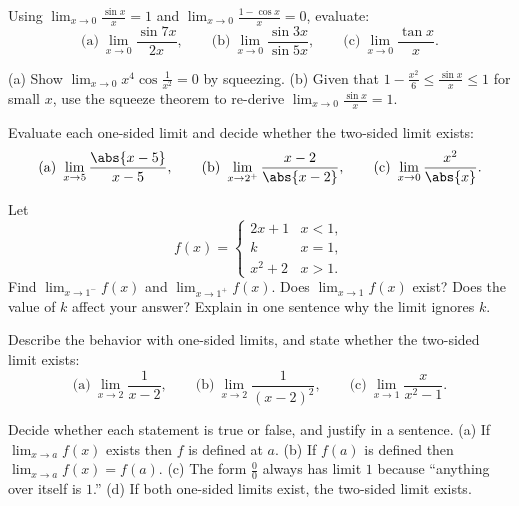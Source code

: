 \begin{exercise}
\label{ch07:exr-trig}
Using $\displaystyle\lim_{x\to 0}\frac{\sin x}{x}=1$ and
$\displaystyle\lim_{x\to 0}\frac{1-\cos x}{x}=0$, evaluate:
\[
  \text{(a)}\ \lim_{x\to 0}\frac{\sin 7x}{2x},
  \qquad
  \text{(b)}\ \lim_{x\to 0}\frac{\sin 3x}{\sin 5x},
  \qquad
  \text{(c)}\ \lim_{x\to 0}\frac{\tan x}{x}.
\]
\end{exercise}

\begin{exercise}[Squeeze]
\label{ch07:exr-squeeze}
(a) Show $\displaystyle\lim_{x\to 0} x^{4}\cos\!\frac{1}{x^{2}} = 0$ by
squeezing. (b) Given that $\displaystyle 1 - \frac{x^{2}}{6} \le
\frac{\sin x}{x} \le 1$ for small $x$, use the squeeze theorem to re-derive
$\displaystyle\lim_{x\to 0}\frac{\sin x}{x}=1$.
\end{exercise}

\begin{exercise}
\label{ch07:exr-onesided}
Evaluate each one-sided limit and decide whether the two-sided limit exists:
\[
  \text{(a)}\ \lim_{x\to 5}\frac{\abs{x-5}}{x-5},
  \qquad
  \text{(b)}\ \lim_{x\to 2^{+}}\frac{x-2}{\abs{x-2}},
  \qquad
  \text{(c)}\ \lim_{x\to 0}\frac{x^{2}}{\abs{x}}.
\]
\end{exercise}

\begin{exercise}[Piecewise]
\label{ch07:exr-piecewise}
Let
\[
  f(x) = \begin{cases} 2x+1 & x < 1,\\ k & x = 1,\\ x^{2}+2 & x > 1.\end{cases}
\]
Find $\displaystyle\lim_{x\to 1^{-}}f(x)$ and
$\displaystyle\lim_{x\to 1^{+}}f(x)$. Does $\displaystyle\lim_{x\to 1}f(x)$
exist? Does the value of $k$ affect your answer? Explain in one sentence why
the limit ignores $k$.
\end{exercise}

\begin{exercise}
\label{ch07:exr-blowup}
Describe the behavior with one-sided limits, and state whether the two-sided
limit exists:
\[
  \text{(a)}\ \lim_{x\to 2}\frac{1}{x-2},
  \qquad
  \text{(b)}\ \lim_{x\to 2}\frac{1}{(x-2)^{2}},
  \qquad
  \text{(c)}\ \lim_{x\to 1}\frac{x}{x^{2}-1}.
\]
\end{exercise}

\begin{exercise}[Conceptual]
\label{ch07:exr-concept}
Decide whether each statement is true or false, and justify in a sentence.
(a) If $\lim_{x\to a} f(x)$ exists then $f$ is defined at $a$.
(b) If $f(a)$ is defined then $\lim_{x\to a} f(x) = f(a)$.
(c) The form $\frac00$ always has limit $1$ because ``anything over itself is
$1$.''
(d) If both one-sided limits exist, the two-sided limit exists.
\end{exercise}

